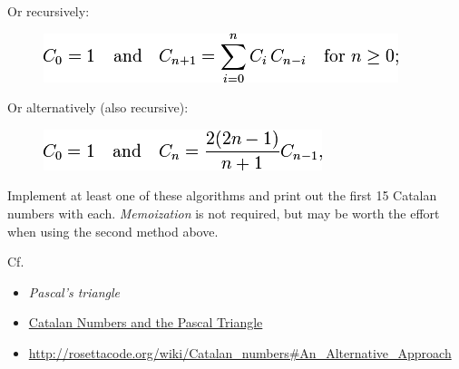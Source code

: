 Or recursively:

\begin{figure}[htbp]
\centering
\includegraphics[scale=.6]{graphics/2f17435a71394ce667ab694b27341560.png}
\end{figure}

Or alternatively (also recursive):

\begin{figure}[htbp]
\centering
\includegraphics[scale=.6]{graphics/619a49e5557ce15be15ecd45dc767c72.png}
\end{figure}

Implement at least one of these algorithms and print out the first 15
Catalan numbers with each. \emph{Memoization} is not
required, but may be worth the effort when using the second method
above.

\begin{description}
\item[Cf.]
\end{description}

\begin{itemize}
\item
  \emph{Pascal's triangle}
\item
  \href{http://milan.milanovic.org/math/english/fibo/fibo4.html}{Catalan
  Numbers and the Pascal Triangle}
\item
  \href{http://rosettacode.org/wiki/Catalan\_numbers\#An\_Alternative\_Approach}{http://rosettacode.org/wiki/Catalan\_numbers\#An\_Alternative\_Approach}
\end{itemize}



